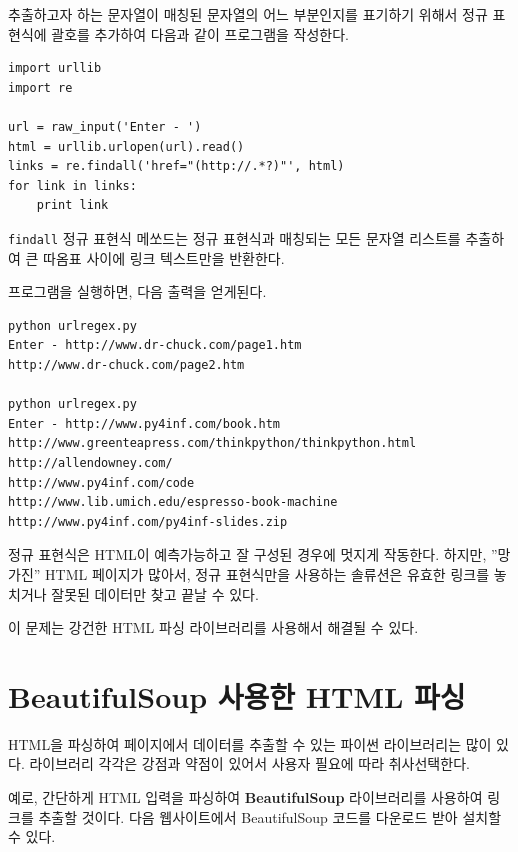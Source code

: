 
추출하고자 하는 문자열이 매칭된 문자열의 어느 부분인지를 표기하기 위해서 정규 표현식에 괄호를 추가하여 다음과 같이 프로그램을 작성한다.


\beforeverb
\begin{verbatim}
import urllib
import re

url = raw_input('Enter - ')
html = urllib.urlopen(url).read()
links = re.findall('href="(http://.*?)"', html)
for link in links:
    print link
\end{verbatim}
\afterverb
%

{\tt findall} 정규 표현식 메쏘드는 정규 표현식과 매칭되는 모든 문자열 리스트를 추출하여 큰 따옴표 사이에 링크 텍스트만을 반환한다.

프로그램을 실행하면, 다음 출력을 얻게된다.

\beforeverb
\begin{verbatim}
python urlregex.py 
Enter - http://www.dr-chuck.com/page1.htm
http://www.dr-chuck.com/page2.htm

python urlregex.py 
Enter - http://www.py4inf.com/book.htm
http://www.greenteapress.com/thinkpython/thinkpython.html
http://allendowney.com/
http://www.py4inf.com/code
http://www.lib.umich.edu/espresso-book-machine
http://www.py4inf.com/py4inf-slides.zip
\end{verbatim}
\afterverb
%

정규 표현식은 HTML이 예측가능하고 잘 구성된 경우에 멋지게 작동한다.
하지만, ''망가진'' HTML 페이지가 많아서, 정규 표현식만을 사용하는 솔류션은 유효한 링크를 놓치거나 잘못된 데이터만 찾고 끝날 수 있다.

이 문제는 강건한 HTML 파싱 라이브러리를 사용해서 해결될 수 있다.

\section{BeautifulSoup 사용한 HTML 파싱}

HTML을 파싱하여 페이지에서 데이터를 추출할 수 있는 파이썬 라이브러리는 많이 있다.
라이브러리 각각은 강점과 약점이 있어서 사용자 필요에 따라 취사선택한다.

예로, 간단하게 HTML 입력을 파싱하여 {\bf BeautifulSoup} 라이브러리를 사용하여 링크를 추출할 것이다.
다음 웹사이트에서 BeautifulSoup 코드를 다운로드 받아 설치할 수 있다.

